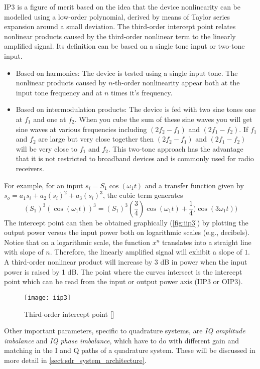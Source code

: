 IP3 is a figure of merit based on the idea that the device nonlinearity can be modelled using a low-order polynomial, derived by means of Taylor series expansion around a small deviation\cite{iip3}. The third-order intercept point relates nonlinear products caused by the third-order nonlinear term to the linearly amplified signal. Its definition can be based on a single tone input or two-tone input.
\begin{itemize}
  \item Based on harmonics: The device is tested using a single input tone. The nonlinear products caused by $n$-th-order nonlinearity appear both at the input tone frequency and at $n$ times it's frequency.
  \item Based on intermodulation products: The device is fed with two sine tones one at $f_1$ and one at $f_2$.  When you cube the sum of these sine waves you will get sine waves at various frequencies including $(2f_2-f_1)$ and $(2f_1-f_2)$.  If $f_1$ and $f_2$ are large but very close together then $(2f_2-f_1)$ and $(2f_1-f_2)$ will be very close to $f_1$ and $f_2$. This two-tone approach has the advantage that it is not restricted to broadband devices and is commonly used for radio receivers.
\end{itemize}
For example, for an input $s_i=S_1 \cos(\omega_1 t)$ and a transfer function given by $s_o=a_1 s_i + a_2 (s_i)^2 + a_3 (s_i)^3$, the cubic term generates
\begin{equation}
  (S_1)^3 (\cos(\omega_1 t))^3 = (S_1)^3 (\frac{3}{4})\cos(\omega_1 t)+\frac{1}{4})\cos(3\omega_1 t))
\end{equation}
The intercept point can then be obtained graphically (\autoref{fig:iip3}) by plotting the output power versus the input power both on logarithmic scales (e.g., decibels). Notice that on a logarithmic scale, the function $x^n$ translates into a straight line with slope of $n$. Therefore, the linearly amplified signal will exhibit a slope of $1$. A third-order nonlinear product will increase by 3 dB in power when the input power is raised by 1 dB. The point where the curves intersect is the intercept point which can be read from the input or output power axis (IIP3 or OIP3).

\begin{figure}[H]
  \centering
  \texttt{[image: iip3]}
  \caption{Third-order intercept point [\citeauthor{iip3}]}
  \label{fig:iip3}
\end{figure}

Other important parameters, specific to quadrature systems, are \emph{IQ amplitude imbalance} and \emph{IQ phase imbalance}, which have to do with different gain and matching in the I and Q paths of a quadrature system. These will be discussed in more detail in \autoref{sect:sdr_system_architecture}.

